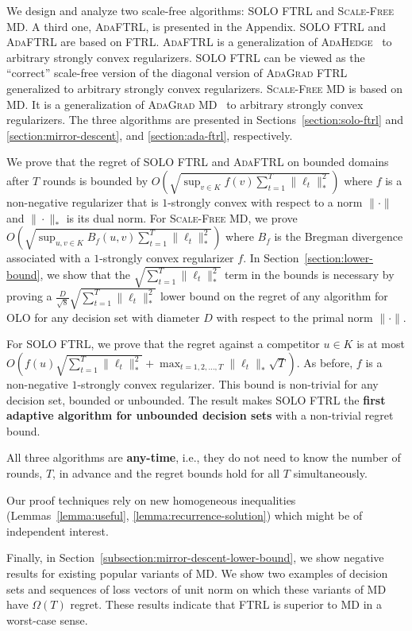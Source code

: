 We design and analyze two scale-free algorithms: \textsc{SOLO FTRL} and
\textsc{Scale-Free MD}.  A third one, \textsc{AdaFTRL}, is presented in
the Appendix. \textsc{SOLO FTRL} and \textsc{AdaFTRL} are based on
\textsc{FTRL}.  \textsc{AdaFTRL} is a generalization of
\textsc{AdaHedge}~\cite{de-Rooij-van-Erven-Grunwald-Koolen-2014} to arbitrary
strongly convex regularizers.  \textsc{SOLO FTRL} can be viewed as the
``correct'' scale-free version of the diagonal version of \textsc{AdaGrad
FTRL}~\cite{Duchi-Hazan-Singer-2011} generalized to arbitrary strongly convex
regularizers.  \textsc{Scale-Free MD} is based on \textsc{MD}. It is a
generalization of \textsc{AdaGrad MD}~\cite{Duchi-Hazan-Singer-2011} to
arbitrary strongly convex regularizers.  The three algorithms are presented in
Sections~\ref{section:solo-ftrl} and \ref{section:mirror-descent}, and
\ref{section:ada-ftrl}, respectively.

We prove that the regret of \textsc{SOLO FTRL} and \textsc{AdaFTRL} on bounded domains after $T$
rounds is bounded by $O (\sqrt{\sup_{v \in K} f(v) \sum_{t=1}^T\|\ell_t\|_*^2} )$
where $f$ is a non-negative regularizer that is $1$-strongly convex with respect
to a norm $\|\cdot\|$ and $\|\cdot\|_*$ is its dual norm. For \textsc{Scale-Free
MD}, we prove $O (\sqrt{\sup_{u,v \in K} B_f(u,v) \sum_{t=1}^T\|\ell_t\|_*^2} )$
where $B_f$ is the Bregman divergence associated with a $1$-strongly convex
regularizer $f$. In Section~\ref{section:lower-bound}, we show that the
$\sqrt{\sum_{t=1}^T \|\ell_t\|_*^2}$ term in the bounds is necessary by proving
a $\frac{D}{\sqrt{8}} \sqrt{\sum_{t=1}^T\|\ell_t\|_*^2}$ lower bound on the
regret of any algorithm for OLO for any decision set with diameter $D$ with
respect to the primal norm $\|\cdot\|$.

For \textsc{SOLO FTRL}, we prove that the regret against a competitor $u \in K$
is at most $O (f(u) \sqrt{\sum_{t=1}^T \|\ell_t\|_*^2} + \max_{t=1,2,\dots,T}
\|\ell_t\|_* \sqrt{T} )$.  As before, $f$ is a non-negative $1$-strongly convex
regularizer. This bound is non-trivial for any decision set, bounded or
unbounded.  The result makes \textsc{SOLO FTRL} the \textbf{first adaptive
algorithm for unbounded decision sets} with a non-trivial regret bound.

All three algorithms are \textbf{any-time}, i.e., they do not need to know the
number of rounds, $T$, in advance and the regret bounds hold for all $T$
simultaneously.

Our proof techniques rely on new homogeneous
inequalities (Lemmas~\ref{lemma:useful}, \ref{lemma:recurrence-solution})
which might be of independent interest.

Finally, in Section~\ref{subsection:mirror-descent-lower-bound}, we show
negative results for existing popular variants of \textsc{MD}. We show two
examples of decision sets and sequences of loss vectors of unit norm on which
these variants of \textsc{MD} have $\Omega(T)$ regret.  These results indicate
that \textsc{FTRL} is superior to \textsc{MD} in a worst-case sense.
